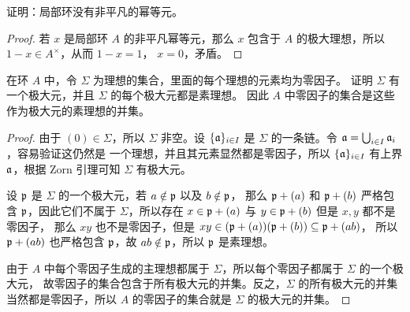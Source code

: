 \begin{problem}
  证明：局部环没有非平凡的幂等元。
\end{problem}
\begin{proof}
  若 $x$ 是局部环 $A$ 的非平凡幂等元，那么 $x$ 包含于 $A$ 的极大理想，所以 $1-x\in A^\times$，从而 $1-x=1$，
  $x=0$，矛盾。
\end{proof}

\begin{problem}
  在环 $A$ 中，令 $\Sigma$ 为理想的集合，里面的每个理想的元素均为零因子。
  证明 $\Sigma$ 有一个极大元，并且 $\Sigma$ 的每个极大元都是素理想。
  因此 $A$ 中零因子的集合是这些作为极大元的素理想的并集。
\end{problem}
\begin{proof}
  由于 $(0)\in\Sigma$，所以 $\Sigma$ 非空。设 $\{\mathfrak{a}\}_{i\in I}$ 是
  $\Sigma$ 的一条链。令 $\mathfrak{a}=\bigcup_{i\in I}\mathfrak{a}_i$，容易验证这仍然是
  一个理想，并且其元素显然都是零因子，所以 $\{\mathfrak{a}\}_{i\in I}$ 有上界
  $\mathfrak{a}$，根据 Zorn 引理可知 $\Sigma$ 有极大元。

  设 $\mathfrak{p}$ 是 $\Sigma$ 的一个极大元，若 $a\notin\mathfrak{p}$ 以及 $b\notin\mathfrak{p}$，
  那么 $\mathfrak{p}+(a)$ 和 $\mathfrak{p}+(b)$ 严格包含 $\mathfrak{p}$，因此它们不属于
  $\Sigma$，所以存在 $x\in \mathfrak{p}+(a)$ 与 $y\in\mathfrak{p}+(b)$ 但是 $x,y$ 都不是零因子，
  那么 $xy$ 也不是零因子，但是 $xy\in( \mathfrak{p}+(a))( \mathfrak{p}+(b))\subseteq \mathfrak{p}+(ab)$，
  所以 $\mathfrak{p}+(ab)$ 也严格包含 $\mathfrak{p}$，故 $ab\notin\mathfrak{p}$，所以 $\mathfrak{p}$ 是素理想。

  由于 $A$ 中每个零因子生成的主理想都属于 $\Sigma$，所以每个零因子都属于 $\Sigma$ 的一个极大元，
  故零因子的集合包含于所有极大元的并集。反之，$\Sigma$ 的所有极大元的并集当然都是零因子，所以
  $A$ 的零因子的集合就是 $\Sigma$ 的极大元的并集。
\end{proof}

